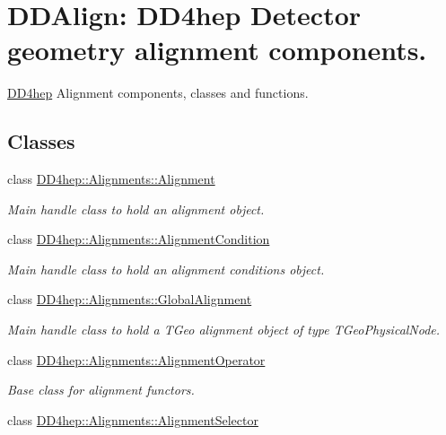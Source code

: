 \hypertarget{group___d_d4_h_e_p___a_l_i_g_n}{
\section{DDAlign: DD4hep Detector geometry alignment components.}
\label{group___d_d4_h_e_p___a_l_i_g_n}
}


\hyperlink{namespace_d_d4hep}{DD4hep} Alignment components, classes and functions.  
\subsection*{Classes}
\begin{DoxyCompactItemize}
\item 
class \hyperlink{class_d_d4hep_1_1_alignments_1_1_alignment}{DD4hep::Alignments::Alignment}
\begin{DoxyCompactList}\small\item\em Main handle class to hold an alignment object. \item\end{DoxyCompactList}\item 
class \hyperlink{class_d_d4hep_1_1_alignments_1_1_alignment_condition}{DD4hep::Alignments::AlignmentCondition}
\begin{DoxyCompactList}\small\item\em Main handle class to hold an alignment conditions object. \item\end{DoxyCompactList}\item 
class \hyperlink{class_d_d4hep_1_1_alignments_1_1_global_alignment}{DD4hep::Alignments::GlobalAlignment}
\begin{DoxyCompactList}\small\item\em Main handle class to hold a TGeo alignment object of type TGeoPhysicalNode. \item\end{DoxyCompactList}\item 
class \hyperlink{class_d_d4hep_1_1_alignments_1_1_alignment_operator}{DD4hep::Alignments::AlignmentOperator}
\begin{DoxyCompactList}\small\item\em Base class for alignment functors. \item\end{DoxyCompactList}\item 
class \hyperlink{class_d_d4hep_1_1_alignments_1_1_alignment_selector}{DD4hep::Alignments::AlignmentSelector}

\end{DoxyCompactItemize}
